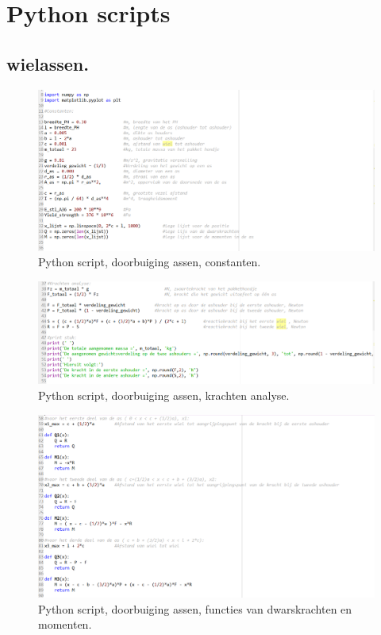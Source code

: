\chapter{Python scripts}
\label{Cha: Bijlage_F}

\section{wielassen.}
\label{Se: bijlage_F wielassen}
\begin{figure}[H]
    \centering
    \includegraphics[width = 120mm]{06_bijlage_F/As_script/Doorbuiging_as_constanten.PNG}
    \caption{Python script, doorbuiging assen, constanten.}
    \label{fig:python_d.a._constanten}
\end{figure}

\vspace{\baselineskip}

\begin{figure}[H]
    \centering
    \includegraphics[width = 120mm]{06_bijlage_F/As_script/Doorbuiging_as_krachten_analyse.PNG}
    \caption{Python script, doorbuiging assen, krachten analyse.}
    \label{fig:python_d.a._krachtenanalyse}
\end{figure}

\vspace{\baselineskip}

\begin{figure}[H]
    \centering
    \includegraphics[width = 120mm]{06_bijlage_F/As_script/Doorbuiging_as_functies.PNG}
    \caption{Python script, doorbuiging assen, functies van dwarskrachten en momenten.}
    \label{fig:python_d.a._functies}
\end{figure}


